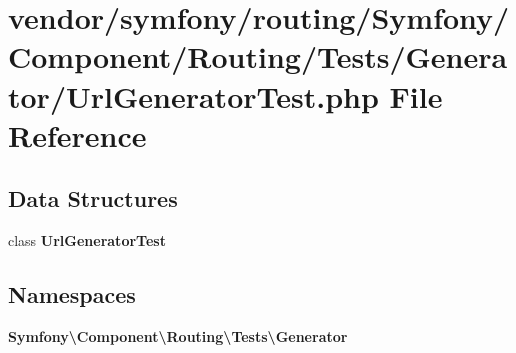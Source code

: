 \section{vendor/symfony/routing/\+Symfony/\+Component/\+Routing/\+Tests/\+Generator/\+Url\+Generator\+Test.php File Reference}
\label{_url_generator_test_8php}
\subsection*{Data Structures}
\begin{DoxyCompactItemize}
\item 
class {\bf Url\+Generator\+Test}
\end{DoxyCompactItemize}
\subsection*{Namespaces}
\begin{DoxyCompactItemize}
\item 
 {\bf Symfony\textbackslash{}\+Component\textbackslash{}\+Routing\textbackslash{}\+Tests\textbackslash{}\+Generator}
\end{DoxyCompactItemize}
